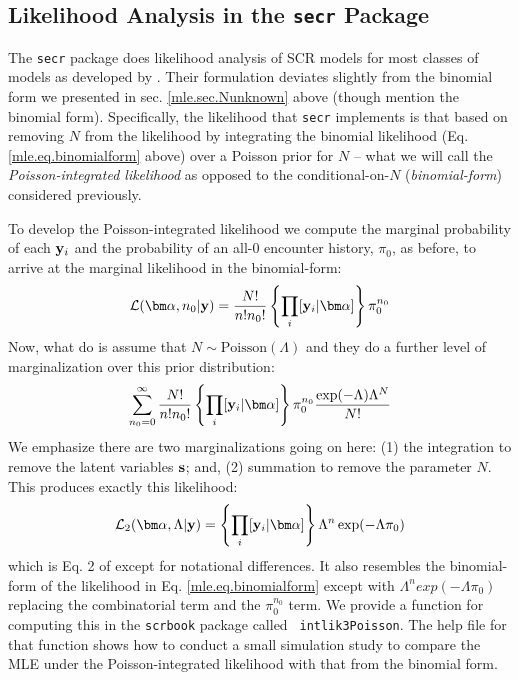 \begin{comment}
As an
exercise, run this analysis for 30 and 40 km buffers and compare those
found in section 4.6 under {\bf WinBUGS}.  
NOTE: The function \mbox{\tt
  secr.fit} 
will return a
warning when the buffer size appears to be too small.  This is useful
particularly with the different units being used between programs and
packages.
\end{comment}

\subsection{Likelihood Analysis in the \mbox{\tt secr} Package}

The \mbox{\tt secr} package does likelihood analysis of SCR models for
most classes of models as developed by
\citet{borchers_efford:2008}. Their formulation deviates slightly from
the binomial form we presented in sec.  \ref{mle.sec.Nunknown} above
(though \citet{borchers_efford:2008} mention the binomial form).
Specifically, the likelihood that \mbox{\tt secr} implements is that
based on removing $N$ from the likelihood by integrating the binomial
likelihood (Eq.  \ref{mle.eq.binomialform} above) over a Poisson prior
for $N$ -- what we will call the {\it Poisson-integrated likelihood} as
opposed to the conditional-on-$N$ ({\it binomial-form}) considered
previously.

To develop the Poisson-integrated likelihood 
we compute the marginal
probability of each ${\bf y}_{i}$ and the probability of an all-0
encounter history, $\pi_{0}$, as before, 
to arrive at the  marginal likelihood in the binomial-form:
\[
 {\cal L}({\bm \alpha},n_{0} | {\bf y})  = \frac{N!}{n! n_{0}!} 
 \left\{ \prod_{i}  [{\bf y}_{i}|{\bm \alpha}] 
\right\}
 \pi_{0}^{n_{0}}
\]
Now, what \citet{borchers_efford:2008} do is
assume that $N \sim \mbox{Poisson}(\Lambda)$ and they do a further level
of marginalization over this prior distribution:
\[
\sum_{n_{0}=0}^{\infty}  
\frac{N!}{n! n_{0}!} 
 \left\{ \prod_{i}  [{\bf y}_{i}|{\bm \alpha}] \right\}
 \pi_{0}^{n_{0}}
\frac{\exp(-\Lambda) \Lambda^{N}}{N!}
\]
We emphasize there are two marginalizations
 going on here: (1) the
integration to remove the latent variables ${\bf s}$; and, (2) 
summation to remove the parameter $N$. 
This produces exactly this likelihood:
\[
{\cal L}_{2}({\bm \alpha}, \Lambda | {\bf y}) = 
 \left\{ \prod_{i}  [{\bf y}_{i}|{\bm \alpha}] \right\}  \Lambda^{n}   \exp( - \Lambda \pi_{0} )
\]
which is Eq. 2 of \citet{borchers_efford:2008} except for notational
differences. It also resembles the binomial-form of the likelihood in
Eq. \ref{mle.eq.binomialform} except with 
$\Lambda^{n}   exp( - \Lambda \pi_{0} )$ replacing the combinatorial
term and the $\pi_{0}^{n_{0}}$ term. We provide a function for
computing this in the \mbox{\tt scrbook} package called \mbox{\tt
  intlik3Poisson}. The help file for that function shows how to
conduct a small simulation study to compare the MLE under the
Poisson-integrated likelihood with that from the binomial form. 

